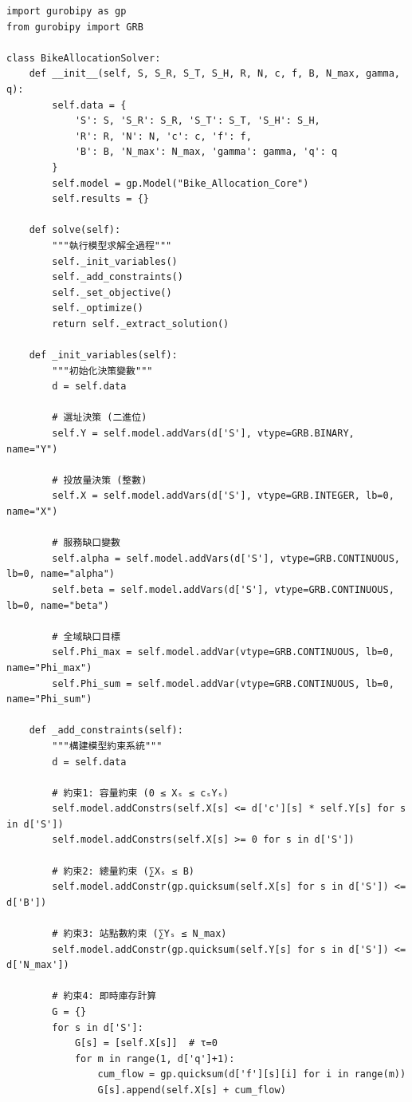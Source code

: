 \begin{verbatim}
import gurobipy as gp
from gurobipy import GRB

class BikeAllocationSolver:
    def __init__(self, S, S_R, S_T, S_H, R, N, c, f, B, N_max, gamma, q):
        self.data = {
            'S': S, 'S_R': S_R, 'S_T': S_T, 'S_H': S_H,
            'R': R, 'N': N, 'c': c, 'f': f,
            'B': B, 'N_max': N_max, 'gamma': gamma, 'q': q
        }
        self.model = gp.Model("Bike_Allocation_Core")
        self.results = {}
    
    def solve(self):
        """執行模型求解全過程"""
        self._init_variables()
        self._add_constraints()
        self._set_objective()
        self._optimize()
        return self._extract_solution()

    def _init_variables(self):
        """初始化決策變數"""
        d = self.data
        
        # 選址決策 (二進位)
        self.Y = self.model.addVars(d['S'], vtype=GRB.BINARY, name="Y")
        
        # 投放量決策 (整數)
        self.X = self.model.addVars(d['S'], vtype=GRB.INTEGER, lb=0, name="X")
        
        # 服務缺口變數
        self.alpha = self.model.addVars(d['S'], vtype=GRB.CONTINUOUS, lb=0, name="alpha")
        self.beta = self.model.addVars(d['S'], vtype=GRB.CONTINUOUS, lb=0, name="beta")
        
        # 全域缺口目標
        self.Phi_max = self.model.addVar(vtype=GRB.CONTINUOUS, lb=0, name="Phi_max")
        self.Phi_sum = self.model.addVar(vtype=GRB.CONTINUOUS, lb=0, name="Phi_sum")

    def _add_constraints(self):
        """構建模型約束系統"""
        d = self.data
        
        # 約束1: 容量約束 (0 ≤ Xₛ ≤ cₛYₛ)
        self.model.addConstrs(self.X[s] <= d['c'][s] * self.Y[s] for s in d['S'])
        self.model.addConstrs(self.X[s] >= 0 for s in d['S'])
        
        # 約束2: 總量約束 (∑Xₛ ≤ B)
        self.model.addConstr(gp.quicksum(self.X[s] for s in d['S']) <= d['B'])
        
        # 約束3: 站點數約束 (∑Yₛ ≤ N_max)
        self.model.addConstr(gp.quicksum(self.Y[s] for s in d['S']) <= d['N_max'])
        
        # 約束4: 即時庫存計算
        G = {}
        for s in d['S']:
            G[s] = [self.X[s]]  # τ=0
            for m in range(1, d['q']+1):
                cum_flow = gp.quicksum(d['f'][s][i] for i in range(m))
                G[s].append(self.X[s] + cum_flow)
        

\end{verbatim}
